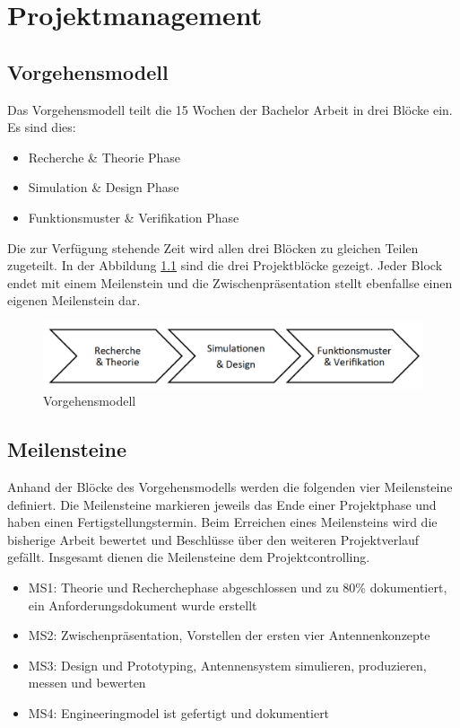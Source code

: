 \newpage
\chapter{Projektmanagement}
\section{Vorgehensmodell}
Das Vorgehensmodell teilt die 15 Wochen der Bachelor Arbeit in drei Blöcke ein. Es sind dies:
\begin{itemize}
\item Recherche \& Theorie Phase
\item Simulation \& Design Phase
\item Funktionsmuster \& Verifikation Phase
\end{itemize}
Die zur Verfügung stehende Zeit wird allen drei Blöcken zu gleichen Teilen zugeteilt. In der Abbildung \ref{Vorgehensmodell} sind die drei Projektblöcke gezeigt. Jeder Block endet mit einem Meilenstein und die Zwischenpräsentation stellt ebenfallse einen eigenen Meilenstein dar. 
\begin{figure}[!ht]
	\begin{center}
		\includegraphics[width=16cm]{content/bilder/Vorgehensmodell.pdf}%
	\end{center}
	\caption{Vorgehensmodell}
	\label{Vorgehensmodell}
\end{figure}
\section{Meilensteine}
Anhand der Blöcke des Vorgehensmodells werden die folgenden vier Meilensteine definiert. Die Meilensteine markieren jeweils das Ende einer Projektphase und haben einen Fertigstellungstermin. Beim Erreichen eines Meilensteins wird die bisherige Arbeit bewertet und Beschlüsse über den weiteren Projektverlauf gefällt. Insgesamt dienen die Meilensteine dem Projektcontrolling.
	\begin{itemize}
		\item MS1: Theorie und Recherchephase abgeschlossen und zu 80\% dokumentiert, ein Anforderungsdokument wurde erstellt
		\item MS2: Zwischenpräsentation, Vorstellen der ersten vier Antennenkonzepte
		\item MS3: Design und Prototyping, Antennensystem simulieren, produzieren, messen und bewerten
		\item MS4: Engineeringmodel ist gefertigt und dokumentiert
	\end{itemize}




